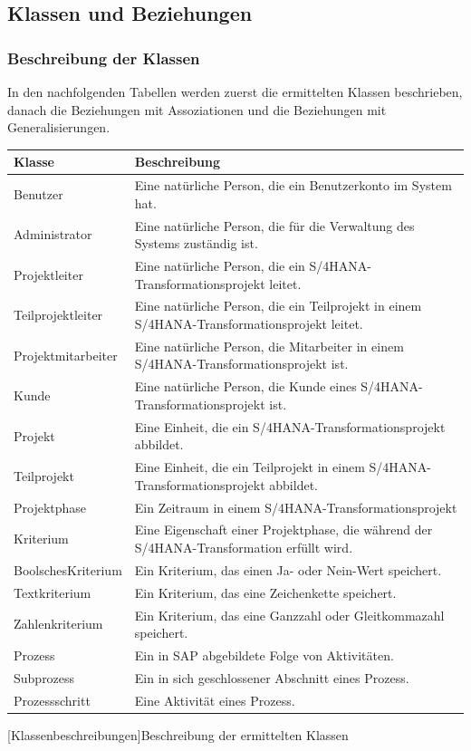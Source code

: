 \newpage
\subsection{Klassen und Beziehungen}
\subsubsection{Beschreibung der Klassen}
In den nachfolgenden Tabellen werden zuerst die ermittelten Klassen beschrieben, danach die Beziehungen mit Assoziationen und die Beziehungen mit Generalisierungen.

\begin{xltabular}{\textwidth}{|p{0.3\textwidth}|p{0.642\textwidth}|}
    \hline
    \textbf{Klasse} & \textbf{Beschreibung} \\\hline\hline
    Benutzer & Eine natürliche Person, die ein Benutzerkonto im System hat.\\\hline
    Administrator & Eine natürliche Person, die für die Verwaltung des Systems zuständig ist. \\\hline
    Projektleiter & Eine natürliche Person, die ein S/4HANA-Transformationsprojekt leitet. \\\hline
    Teilprojektleiter & Eine natürliche Person, die ein Teilprojekt in einem S/4HANA-Transformationsprojekt leitet. \\\hline
    Projektmitarbeiter & Eine natürliche Person, die Mitarbeiter in einem S/4HANA-Transformationsprojekt ist. \\\hline
    Kunde &  Eine natürliche Person, die Kunde eines S/4HANA-Transformationsprojekt ist.\\\hline
    Projekt & Eine Einheit, die ein S/4HANA-Transformationsprojekt abbildet. \\\hline
    Teilprojekt & Eine Einheit, die ein Teilprojekt in einem S/4HANA-Transformationsprojekt abbildet. \\\hline
    Projektphase & Ein Zeitraum in einem S/4HANA-Transformationsprojekt\\\hline
    Kriterium & Eine Eigenschaft einer Projektphase, die während der S/4HANA-Transformation erfüllt wird. \\\hline
    BoolschesKriterium & Ein Kriterium, das einen Ja- oder Nein-Wert speichert.\\\hline
    Textkriterium & Ein Kriterium, das eine Zeichenkette speichert.\\\hline
    Zahlenkriterium & Ein Kriterium, das eine Ganzzahl oder Gleitkommazahl speichert. \\\hline
    Prozess &  Ein in SAP abgebildete Folge von Aktivitäten.\\\hline
    Subprozess &  Ein in sich geschlossener Abschnitt eines Prozess.\\\hline
    Prozessschritt & Eine Aktivität eines Prozess.\\\hline
\end{xltabular}
[Klassenbeschreibungen]{Beschreibung der ermittelten Klassen}

